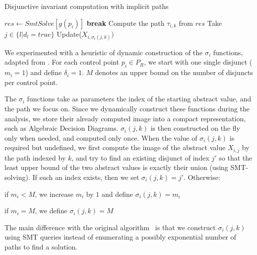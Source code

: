 \documentclass{llncs}
\newcommand{\MM}[1]{{\color{blue} TODO(MM): #1}}
\newcommand{\JH}[1]{{\color{teal} TODO(JH): #1}}
\newcommand{\DM}[1]{{\color{violet} TODO(DM): #1}}
\newcommand{\MM}[1]{}
\newcommand{\JH}[1]{}
\newcommand{\DM}[1]{}
\begin{document}
\begin{algorithm}[!h]
\caption{Disjunctive invariant computation with implicit paths}\label{gulwani2}
\label{algo:disjunctive}
\begin{algorithmic}[1] 
	\STATE $res \gets SmtSolve\left[g(p_i)\right]$
		\STATE \textbf{break}
	\ENDIF
	\STATE Compute the path $\tau_{i,k}$ from $res$ 
	\STATE Take $j \in \{ l | d_l = true\}$ 
	\STATE Update($X_{i,\sigma_i(j,k)})$
\ENDWHILE
\end{algorithmic}
\end{algorithm}

We experimented with a heuristic
of dynamic construction of the $\sigma_i$ functions, adapted from
\cite{DBLP:conf/pldi/GulwaniZ10}. 
For each control point $p_i \in P_R$, we start with one single disjunct
($m_i = 1$) and define $\delta_i = 1$.
$M$ denotes an upper bound on the number of disjuncts per control point.

The $\sigma_i$ functions take as parameters the index of the starting abstract
value, and the path we focus on. 
Since we dynamically construct these functions
during the analysis, we store their already computed image into a
compact representation, such as Algebraic Decision Diagrams.
$\sigma_i(j,k)$ is then constructed on the fly only when needed, and computed
only once.
When the value of $\sigma_i(j,k)$ is required but undefined, we first compute
the image of the
abstract value $X_{i,j}$ by the path indexed by $k$, and try to find an existing
disjunct of index $j'$ so that the least upper bound of the two abstract values is exactly their union (using SMT-solving).
If such an index exists, then we set $\sigma_i(j,k) = j'$.
Otherwise:
\begin{compactitem}
	\item if $m_i < M$, we increase $m_i$ by $1$ and define $\sigma_i(j,k) = m_i$
	\item if $m_i = M$, we define $\sigma_i(j,k) = M$ 
\end{compactitem}
The main difference with the original
algorithm~\cite{DBLP:conf/pldi/GulwaniZ10} is that we construct
$\sigma_i(j,k)$ using SMT queries instead of enumerating a possibly
exponential number of paths to find a solution.
\end{document}
